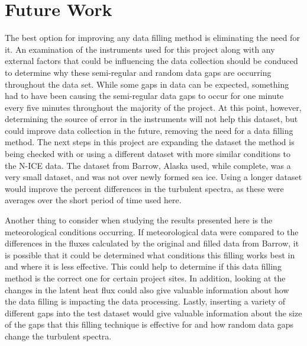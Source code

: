  \section{Future Work}
The best option for improving any data filling method is eliminating the need for it. An examination of the instruments used for this project along with any external factors that could be influencing the data collection should be conduced to determine why these semi-regular and random data gaps are occurring throughout the data set. While some gaps in data can be expected, something had to have been causing the semi-regular data gaps to occur for one minute every five minutes throughout the majority of the project. At this point, however, determining the source of error in the instruments will not help this dataset, but could improve data collection in the future, removing the need for a data filling method.
The next steps in this project are expanding the dataset the method is being checked with or using a different dataset with more similar conditions to the N-ICE data. The dataset from Barrow, Alaska used, while complete, was a very small dataset, and was not over newly formed sea ice. Using a longer dataset would improve the percent differences in the turbulent spectra, as these were averages over the short period of time used here. 



Another thing to consider when studying the results presented here is the meteorological conditions occurring. If meteorological data were compared to the differences in the fluxes calculated by the original and filled data from Barrow, it is possible that it could be determined what conditions this filling works best in and where it is less effective. This could help to determine if this data filling method is the correct one for certain project sites. In addition, looking at the changes in the latent heat flux could also give valuable information about how the data filling is impacting the data processing. Lastly, inserting a variety of different gaps into the test dataset would give valuable information about the size of the gaps that this filling technique is effective for and how random data gaps change the turbulent spectra. 

